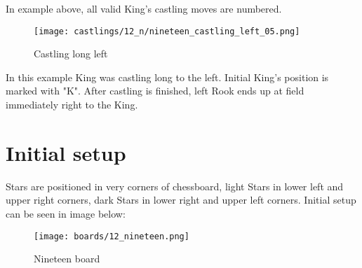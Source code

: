 In example above, all valid King's castling moves are numbered.

\noindent
\begin{figure}[!h]
\texttt{[image: castlings/12\_n/nineteen\_castling\_left\_05.png]}
\caption{Castling long left}
\label{fig:nineteen_castling_left_05}
\end{figure}

In this example King was castling long to the left. Initial King's position is marked with "K".
After castling is finished, left Rook ends up at field immediately right to the King.

\clearpage %

\section*{Initial setup}

Stars are positioned in very corners of chessboard, light Stars in lower left and upper right
corners, dark Stars in lower right and upper left corners. Initial setup can be seen in image below:

\noindent
\begin{figure}[h]
\texttt{[image: boards/12\_nineteen.png]}
\caption{Nineteen board}
\label{fig:12_nineteen}
\end{figure}

\clearpage %
